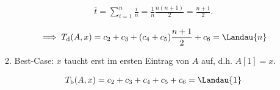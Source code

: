 \begin{solution}
\begin{enumerate}[label = (\alph*)]
\begin{enumerate}[label = \arabic*.]
    \begin{align*}
      \overline{t}
      =
      \sum_{i=1}^n \frac{i}{n}
      =
      \frac{1}{n} \frac{n (n + 1)}{2}
      =
      \frac{n + 1}{2}.
    \end{align*}

    \begin{align*}
      \implies
      T_{\mathrm{d}}(A, x)
      =
      c_2 + c_3 + (c_4 + c_5) \frac{n + 1}{2} + c_6
      =
      \Landau{n}
    \end{align*}  

    \item Best-Case:
    $x$ taucht erst im ersten Eintrag von $A$ auf, d.h. $A[1] = x$.

    \begin{align*}
      T_{\mathrm{b}}(A, x)
      =
      c_2 + c_3 + c_4 + c_5 + c_6
      =
      \Landau{1}
    \end{align*}
  
  \end{enumerate}

\end{enumerate}

\end{solution}


